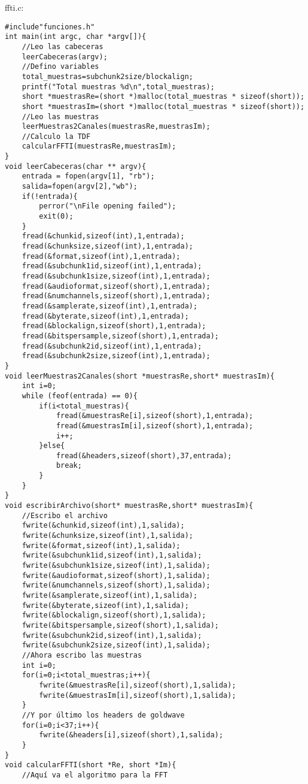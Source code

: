 \newpage
ffti.c:
\begin{lstlisting}[style=CStyle]
#include"funciones.h"
int main(int argc, char *argv[]){
	//Leo las cabeceras
	leerCabeceras(argv);
	//Defino variables    
	total_muestras=subchunk2size/blockalign;
	printf("Total muestras %d\n",total_muestras);
	short *muestrasRe=(short *)malloc(total_muestras * sizeof(short));
	short *muestrasIm=(short *)malloc(total_muestras * sizeof(short));
	//Leo las muestras
	leerMuestras2Canales(muestrasRe,muestrasIm);
	//Calculo la TDF
	calcularFFTI(muestrasRe,muestrasIm);
}
void leerCabeceras(char ** argv){
	entrada = fopen(argv[1], "rb");
	salida=fopen(argv[2],"wb");
	if(!entrada){
		perror("\nFile opening failed");
		exit(0);
	}
	fread(&chunkid,sizeof(int),1,entrada);
	fread(&chunksize,sizeof(int),1,entrada);
	fread(&format,sizeof(int),1,entrada);
	fread(&subchunk1id,sizeof(int),1,entrada);
	fread(&subchunk1size,sizeof(int),1,entrada);
	fread(&audioformat,sizeof(short),1,entrada);
	fread(&numchannels,sizeof(short),1,entrada);
	fread(&samplerate,sizeof(int),1,entrada);
	fread(&byterate,sizeof(int),1,entrada);
	fread(&blockalign,sizeof(short),1,entrada);
	fread(&bitspersample,sizeof(short),1,entrada);
	fread(&subchunk2id,sizeof(int),1,entrada);
	fread(&subchunk2size,sizeof(int),1,entrada);
}
void leerMuestras2Canales(short *muestrasRe,short* muestrasIm){
	int i=0;
	while (feof(entrada) == 0){
		if(i<total_muestras){
			fread(&muestrasRe[i],sizeof(short),1,entrada);
			fread(&muestrasIm[i],sizeof(short),1,entrada);
			i++;
		}else{
			fread(&headers,sizeof(short),37,entrada);
			break;
		}
	}
}
void escribirArchivo(short* muestrasRe,short* muestrasIm){
	//Escribo el archivo
	fwrite(&chunkid,sizeof(int),1,salida);
	fwrite(&chunksize,sizeof(int),1,salida);
	fwrite(&format,sizeof(int),1,salida);
	fwrite(&subchunk1id,sizeof(int),1,salida);
	fwrite(&subchunk1size,sizeof(int),1,salida);
	fwrite(&audioformat,sizeof(short),1,salida);
	fwrite(&numchannels,sizeof(short),1,salida);
	fwrite(&samplerate,sizeof(int),1,salida);
	fwrite(&byterate,sizeof(int),1,salida);
	fwrite(&blockalign,sizeof(short),1,salida);
	fwrite(&bitspersample,sizeof(short),1,salida);
	fwrite(&subchunk2id,sizeof(int),1,salida);
	fwrite(&subchunk2size,sizeof(int),1,salida);
	//Ahora escribo las muestras
	int i=0;
	for(i=0;i<total_muestras;i++){
		fwrite(&muestrasRe[i],sizeof(short),1,salida);
		fwrite(&muestrasIm[i],sizeof(short),1,salida);
	}
	//Y por último los headers de goldwave
	for(i=0;i<37;i++){
		fwrite(&headers[i],sizeof(short),1,salida);
	}
}
void calcularFFTI(short *Re, short *Im){
	//Aquí va el algoritmo para la FFT

\end{lstlisting}
